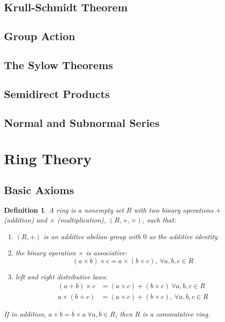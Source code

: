 \documentclass[a4paper,8pt]{article}
\theoremstyle{theorem}
\newtheorem{definition}[theorem]{Definition}
\begin{document}
\subsection{Krull-Schmidt Theorem}

\subsection{Group Action}

\subsection{The Sylow Theorems}

\subsection{Semidirect Products}

\subsection{Normal and Subnormal Series}

\newpage

\section{Ring Theory}

\subsection{Basic Axioms}

\begin{definition}
A \textit{{\color{blue} ring}} is a nonempty set $ R $ with two binary operations $ + $ (addition) and $ \times $ (multiplication), $ (R, +, \times) $, such that:
\begin{enumerate}[label=(\roman*)]
\item $(R, +)$ is an additive abelian group with $0$ as the additive identity
\item the binary operation $\times$ is associative: 
\begin{equation}
(a \times b) \times c = a \times (b \times c), \ \forall a, b, c \in R
\nonumber
\end{equation}
\item left and right distributive laws: 
\begin{align}
(a+b) \times c &= (a \times c) + (b \times c) \ \forall a, b, c \in R \nonumber \\
a \times (b+c) &= (a \times c) + (b \times c), \ \forall a, b, c \in R \nonumber
\end{align}
\end{enumerate}
If in addition, $a \times b = b \times a \ \forall a, b \in R$, then $R$ is a \textit{{\color{blue} commutative ring}}.
\end{definition}
\end{document}
